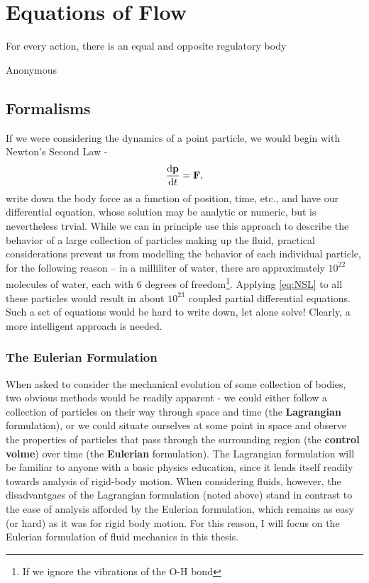 \setcounter{secnumdepth}{3}
\chapter{Equations of Flow}
    	 	\epigraph{For every action, there is an equal and opposite regulatory body}{Anonymous}
\section{Formalisms}
If we were considering the dynamics of a point particle, we would begin with Newton's Second Law - 
\begin{equation}\label{eq:NSL}
\der{1}{\Vector{p}}{t} = \Vector{F}, 
\end{equation}
write down the body force as a function of position, time, etc., and have our differential equation, whose solution may be analytic or numeric, but is nevertheless trvial. While we can in principle use this approach to describe the behavior of a large collection of particles making up the fluid, practical considerations prevent us from modelling the behavior of each individual particle, for the following reason -- in a milliliter of water, there are approximately $10^{22}$ molecules of water, each with 6 degrees of freedom\footnote{If we ignore the vibrations of the O-H bond}. Applying \eqref{eq:NSL} to all these particles would result in about $10^{23}$ coupled partial differential equations. Such a set of equations would be hard to write down, let alone solve! Clearly, a more intelligent approach is needed. \\

\subsection{The Eulerian Formulation}

When asked to consider the mechanical evolution of some collection of bodies, two obvious methods would be readily apparent - we could either follow a collection of particles on their way through space and time (the {\bf Lagrangian} formulation), or we could situate ourselves at some point in space and observe the properties of particles that pass through the surrounding region (the {\bf control volme}) over time (the {\bf Eulerian} formulation). The Lagrangian formulation will be familiar to anyone with a basic physics education, since it lends itself readily towards analysis of rigid-body motion. When considering fluids, however, the disadvantgaes of the Lagrangian formulation (noted above) stand in contrast to the ease of analysis afforded by the Eulerian formulation, which remains as easy (or hard) as it was for rigid body motion. For this reason, I will focus on the Eulerian formulation of fluid mechanics in this thesis. 

